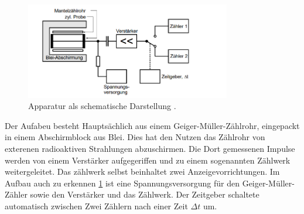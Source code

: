\begin{figure}
  \centering
  \includegraphics[width=0.8\textwidth]{bilder/Schematische Darstellung des Versuchsaufbaus.png}
  \caption{Apparatur als schematische Darstellung \cite{skript}.}
  \label{fig:aufbau}
\end{figure}
Der Aufabeu besteht Hauptsächlich aus einem Geiger-Müller-Zählrohr, eingepackt in einem Abschirmblock aus Blei. Dies hat den Nutzen das Zählrohr von exterenen 
radioaktiven Strahlungen abzuschirmen. Die Dort gemessenen Impulse werden von einem Verstärker aufgegeriffen und zu einem sogenannten Zählwerk weitergeleitet. 
Das zählwerk selbst beinhaltet zwei Anzeigevorrichtungen. 
Im Aufbau auch zu erkennen \ref{fig:aufbau} ist eine Spannungsversorgung für den Geiger-Müller-Zähler sowie den Verstärker und das Zählwerk. 
Der Zeitgeber schaltete automatisch zwischen Zwei Zählern nach einer Zeit $\Delta t$ um.

